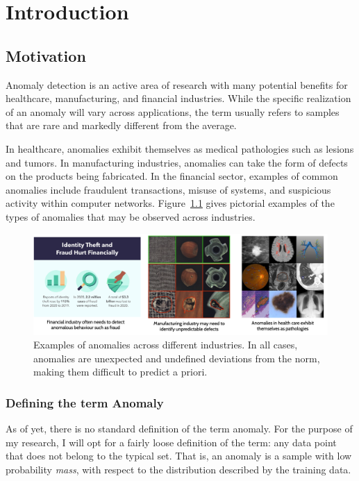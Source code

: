 \chapter{Introduction}

\section{Motivation}

Anomaly detection is an active area of research with many potential benefits for healthcare, manufacturing, and financial industries. While the specific realization of an anomaly will vary across applications, the term usually refers to samples that are rare and markedly different from the average.

In healthcare, anomalies exhibit themselves as medical pathologies such as lesions and tumors. In  manufacturing industries, anomalies can take the form of defects on the products being fabricated. In the financial sector, examples of common anomalies include fraudulent transactions, misuse of systems, and suspicious activity within computer networks. Figure~\ref{fig:anoex} gives pictorial examples of the types of anomalies that may be observed across industries.

\begin{figure}[bhp]
\centering
    \centering
    \includegraphics[width=\textwidth]{figures/anomaly_examples.png}
    \caption{Examples of anomalies across different industries. In all cases, anomalies are unexpected and undefined deviations from the norm, making them difficult to predict a priori.}
    \label{fig:anoex}

\end{figure}%

\subsection*{Defining the term Anomaly}
As of yet, there is no standard definition of the term anomaly. 
For the purpose of my research, I will opt for a fairly loose definition of the term: any data point that does not belong to the typical set. That is, an anomaly is a sample with low probability \textit{mass}, with respect to the distribution described by the training data. 

